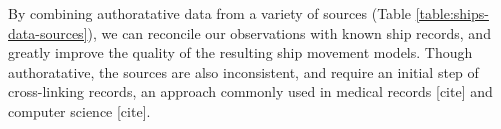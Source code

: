 




By combining authoratative data from a variety of sources (Table \ref{table:ships-data-sources}), we can reconcile our observations with known ship records, and greatly improve the quality of the resulting ship movement models. Though authoratative, the sources are also inconsistent, and require an initial step of cross-linking records, an approach commonly used in medical records [cite] and computer science [cite].


